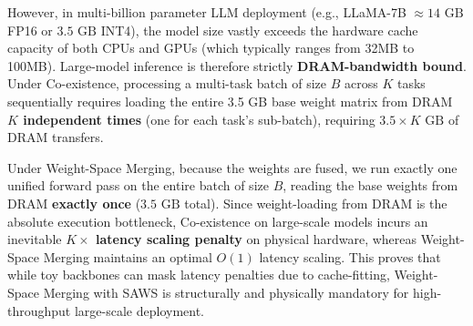 \documentclass{article}
\theoremstyle{plain}
\theoremstyle{definition}
\theoremstyle{remark}
\begin{document}
However, in multi-billion parameter LLM deployment (e.g., LLaMA-7B $\approx 14\text{ GB}$ FP16 or $3.5\text{ GB}$ INT4), the model size vastly exceeds the hardware cache capacity of both CPUs and GPUs (which typically ranges from 32MB to 100MB). Large-model inference is therefore strictly \textbf{DRAM-bandwidth bound}. Under Co-existence, processing a multi-task batch of size $B$ across $K$ tasks sequentially requires loading the entire 3.5 GB base weight matrix from DRAM \textbf{$K$ independent times} (one for each task's sub-batch), requiring $3.5 \times K \text{ GB}$ of DRAM transfers. 

Under Weight-Space Merging, because the weights are fused, we run exactly one unified forward pass on the entire batch of size $B$, reading the base weights from DRAM \textbf{exactly once} ($3.5\text{ GB}$ total). Since weight-loading from DRAM is the absolute execution bottleneck, Co-existence on large-scale models incurs an inevitable \textbf{$K\times$ latency scaling penalty} on physical hardware, whereas Weight-Space Merging maintains an optimal $O(1)$ latency scaling. This proves that while toy backbones can mask latency penalties due to cache-fitting, Weight-Space Merging with SAWS is structurally and physically mandatory for high-throughput large-scale deployment.
\end{document}
